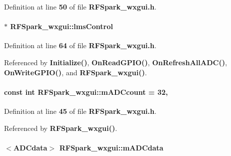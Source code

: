 Definition at line {\bf 50} of file {\bf R\+F\+Spark\+\_\+wxgui.\+h}.

\paragraph[{lms\+Control}]{$\ast$ R\+F\+Spark\+\_\+wxgui\+::lms\+Control\hspace{0.3cm}{\ttfamily [protected]}}\label{classRFSpark__wxgui_aae30af9b7ba0b185694734a521f62194}


Definition at line {\bf 64} of file {\bf R\+F\+Spark\+\_\+wxgui.\+h}.



Referenced by {\bf Initialize()}, {\bf On\+Read\+G\+P\+I\+O()}, {\bf On\+Refresh\+All\+A\+D\+C()}, {\bf On\+Write\+G\+P\+I\+O()}, and {\bf R\+F\+Spark\+\_\+wxgui()}.

\paragraph[{m\+A\+D\+Ccount}]{\setlength{\rightskip}{0pt plus 5cm}const {\bf int} R\+F\+Spark\+\_\+wxgui\+::m\+A\+D\+Ccount = 32\hspace{0.3cm}{\ttfamily [static]}, {\ttfamily [protected]}}\label{classRFSpark__wxgui_a187d37db91fe10ed7f3a0101cfbb5155}


Definition at line {\bf 45} of file {\bf R\+F\+Spark\+\_\+wxgui.\+h}.



Referenced by {\bf R\+F\+Spark\+\_\+wxgui()}.

\paragraph[{m\+A\+D\+Cdata}]{$<${\bf A\+D\+Cdata}$>$ R\+F\+Spark\+\_\+wxgui\+::m\+A\+D\+Cdata\hspace{0.3cm}{\ttfamily [protected]}}\label{classRFSpark__wxgui_acf4840b0658edd2d9dfc119bb4d50d2c}


